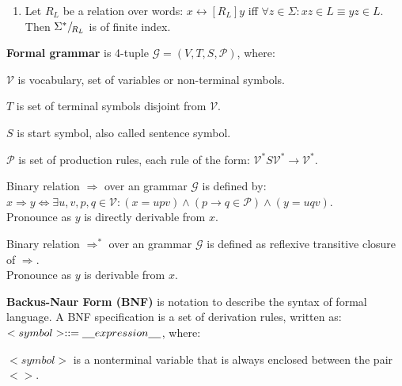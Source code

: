 \documentclass[a4paper,10pt]{article}
\begin{document}
\begin{terms}
\begin{enumerate}
        \item Let $R_L$ be a relation over words: $x \rel[R_L] y$ iff $\forall z \in \Sigma : xz \in L \equiv yz \in L$.
        Then $\quotient[R_L]{\Sigma^*}$ is of finite index.
    \end{enumerate}

    \newpage
    \item \textbf{Formal grammar} is 4-tuple $\mathcal{G} = (V, T, S, \mathcal{P})$, where:

    \begin{terms} 
        \item $\mathcal{V}$ is vocabulary, set of variables or non-terminal symbols.

        \item $T$ is set of terminal symbols disjoint from $\mathcal{V}$.

        \item $S$ is start symbol, also called sentence symbol.

        \item $\mathcal{P}$ is set of production rules, each rule of the form:
        $\mathcal{V}^*S\mathcal{V}^* \xrightarrow{} \mathcal{V}^*$.
    \end{terms}

    \item Binary relation $\mathbf{\Rightarrow}$ over an grammar $\mathcal{G}$ is defined by:\\
    $x \Rightarrow y \Longleftrightarrow \exists u,v,p,q \in \mathcal{V}: (x = upv) \land (p \rightarrow{} q \in \mathcal{P}) \land (y = uqv)$.\\
    Pronounce as $y$ is directly derivable from $x$.
    \item Binary relation $\mathbf{\Rightarrow^*}$ over an grammar $\mathcal{G}$ is defined as reflexive transitive closure of $\Rightarrow$.\\
    Pronounce as $y$ is derivable from $x$.

    \item \textbf{Backus-Naur Form (BNF)} is notation to describe the syntax of formal language. A BNF specification is a set of derivation rules, written as:\\
    $<symbol> ::= \underline{\hspace{4mm}}{}expression\underline{\hspace{4mm}}$, where:
    \begin{terms}
        \item $<symbol>$ is a nonterminal variable that is always enclosed between the pair $<>$.


\end{terms}
\end{terms}
\end{document}
